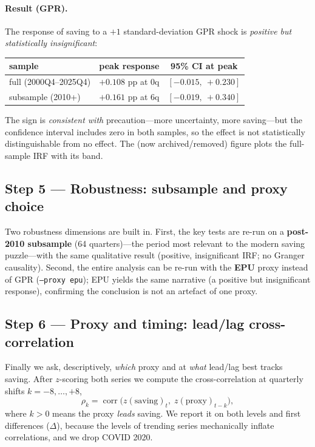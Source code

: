 \documentclass[11pt,a4paper]{article}
\newcommand{\code}[1]{\texttt{#1}}
\begin{document}
\paragraph{Result (GPR).} The response of saving to a $+1$ standard-deviation GPR
shock is \emph{positive but statistically insignificant}:
\begin{center}
\begin{tabular}{@{}lcc@{}}
\toprule
sample & peak response & 95\% CI at peak \\
\midrule
full (2000Q4--2025Q4) & $+0.108$ pp at 0q & $[-0.015,\ +0.230]$ \\
subsample (2010+)     & $+0.161$ pp at 6q & $[-0.019,\ +0.340]$ \\
\bottomrule
\end{tabular}
\end{center}
The sign is \emph{consistent with} precaution---more uncertainty, more
saving---but the confidence interval includes zero in both samples, so the effect
is not statistically distinguishable from no effect. The (now archived/removed) figure
plots the full-sample IRF with its band.



\subsection{Step 5 --- Robustness: subsample and proxy choice}
Two robustness dimensions are built in. First, the key tests are re-run on a
\textbf{post-2010 subsample} (64 quarters)---the period most relevant to the
modern saving puzzle---with the same qualitative result (positive, insignificant
IRF; no Granger causality). Second, the entire analysis can be re-run with the
\textbf{EPU} proxy instead of GPR (\code{--proxy epu}); EPU yields the same
narrative (a positive but insignificant response), confirming the conclusion is
not an artefact of one proxy.

\subsection{Step 6 --- Proxy and timing: lead/lag cross-correlation}
\label{sec:timing}
Finally we ask, descriptively, \emph{which} proxy and at \emph{what} lead/lag
best tracks saving. After $z$-scoring both series we compute the
cross-correlation at quarterly shifts $k=-8,\dots,+8$,
\begin{equation}
  \rho_k = \operatorname{corr}\!\big(z(\text{saving})_t,\;
                                     z(\text{proxy})_{t-k}\big),
\end{equation}
where $k>0$ means the proxy \emph{leads} saving. We report it on both levels and
first differences ($\Delta$), because the levels of trending series mechanically
inflate correlations, and we drop COVID 2020.
\end{document}

